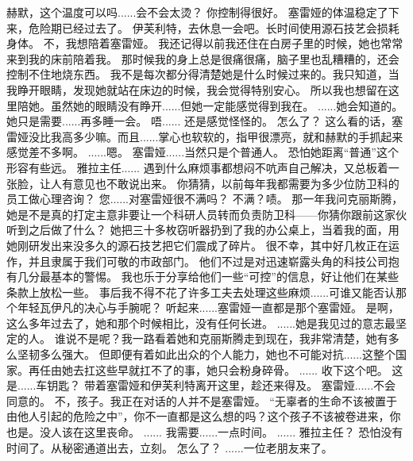 \documentclass[openany]{book}
\begin{document}
\begin{dialogue}
     赫默，这个温度可以吗......会不会太烫？
     你控制得很好。
     塞雷娅的体温稳定了下来，危险期已经过去了。
     伊芙利特，去休息一会吧。长时间使用源石技艺会损耗身体。
     不，我想陪着塞雷娅。
     我还记得以前我还住在白房子里的时候，她也常常来到我的床前陪着我。
     那时候我的身上总是很痛很痛，脑子里也乱糟糟的，还会控制不住地烧东西。
     我不是每次都分得清楚她是什么时候过来的。我只知道，当我睁开眼睛，发现她就站在床边的时候，我会觉得特别安心。
     所以我也想留在这里陪她。虽然她的眼睛没有睁开......但她一定能感觉得到我在。
     ......她会知道的。
     她只是需要......再多睡一会。
     唔......
     还是感觉怪怪的。
     怎么了？
     这么看的话，塞雷娅没比我高多少嘛。而且......掌心也软软的，指甲很漂亮，就和赫默的手抓起来感觉差不多啊。
     ......嗯。
     塞雷娅......当然只是个普通人。
     恐怕她距离“普通”这个形容有些远。
     雅拉主任......
     遇到什么麻烦事都想闷不吭声自己解决，又总板着一张脸，让人有意见也不敢说出来。
     你猜猜，以前每年我都需要为多少位防卫科的员工做心理咨询？
     您......对塞雷娅很不满吗？
     不满？啧。
     那一年我问克丽斯腾，她是不是真的打定主意非要让一个科研人员转而负责防卫科——你猜你跟前这家伙听到之后做了什么？
     她把三十多枚窃听器扔到了我的办公桌上，当着我的面，用她刚研发出来没多久的源石技艺把它们震成了碎片。
     很不幸，其中好几枚正在运作，并且隶属于我们可敬的市政部门。
     他们不过是对迅速崭露头角的科技公司抱有几分最基本的警惕。
     我也乐于分享给他们一些“可控”的信息，好让他们在某些条款上放松一些。
     事后我不得不花了许多工夫去处理这些麻烦......可谁又能否认那个年轻瓦伊凡的决心与手腕呢？
     听起来......塞雷娅一直都是那个塞雷娅。
     是啊，这么多年过去了，她和那个时候相比，没有任何长进。
     ......她是我见过的意志最坚定的人。
     谁说不是呢？我一路看着她和克丽斯腾走到现在，我非常清楚，她有多么坚韧多么强大。
     但即便有着如此出众的个人能力，她也不可能对抗......这整个国家。再任由她去扛这些早就扛不了的事，她只会粉身碎骨。
     ......
     收下这个吧。
     这是......车钥匙？
     带着塞雷娅和伊芙利特离开这里，趁还来得及。
     塞雷娅......不会同意的。
     不，孩子。我正在对话的人并不是塞雷娅。
     “无辜者的生命不该被置于由他人引起的危险之中”，你不一直都是这么想的吗？这个孩子不该被卷进来，你也是。没人该在这里丧命。
     ......
     我需要......一点时间。
     ......
     雅拉主任？
     恐怕没有时间了。从秘密通道出去，立刻。
     怎么了？
     ......一位老朋友来了。
\end{dialogue}
\end{document}
